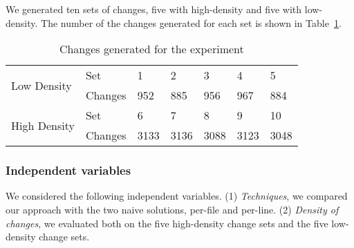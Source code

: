 We generated ten sets of changes, five with high-density and five with
low-density. The number of the changes generated for each set is shown in Table~\ref{tbl:changes}.
\begin{table}[htbp]
\caption{Changes generated for the experiment}\label{tbl:changes}
\centering
\begin{tabular}{|l|l|lllll|}
  \hline
  \multirow{2}{2cm}{Low Density} & Set & 1 & 2 & 3 & 4 & 5  \\
  \cline{2-7}
                                 & Changes & 952 & 885 & 956 & 967 & 884 \\
  \hline
  \multirow{2}{2cm}{High Density} & Set & 6 & 7 & 8 & 9 & 10 \\
  \cline{2-7}
                                 & Changes & 3133 & 3136 & 3088 & 3123 & 3048\\
  \hline
\end{tabular}
\end{table}

\subsubsection{Independent variables}
We considered the following independent variables. (1)
\emph{Techniques}, we compared our approach with the two naive
solutions, per-file and per-line. (2) \emph{Density of changes}, we
evaluated both on the five high-density change sets and the five
low-density change sets. %

